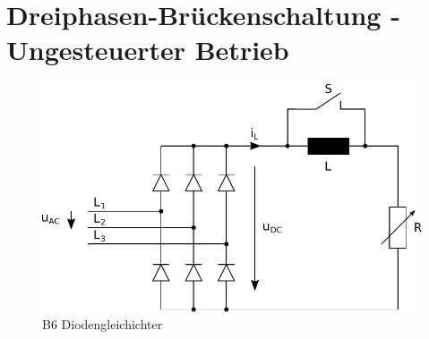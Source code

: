 \section{Dreiphasen-Brückenschaltung - Ungesteuerter Betrieb}

\begin{figure}[h!]
    \centering
    \includegraphics[scale=\sscale]{./../fig/b6_diode.pdf}
    \caption{B6 Diodengleichichter}
    \label{fig:b6_diode}
\end{figure}
